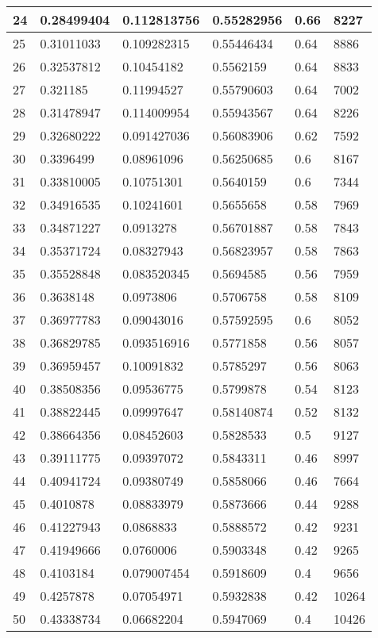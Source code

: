 \begin{longtable}{|l|l|l|l|l|l|}
24 & 0.28499404 & 0.112813756 & 0.55282956 & 0.66 & 8227 \\ \hline 
25 & 0.31011033 & 0.109282315 & 0.55446434 & 0.64 & 8886 \\ \hline 
26 & 0.32537812 & 0.10454182 & 0.5562159 & 0.64 & 8833 \\ \hline 
27 & 0.321185 & 0.11994527 & 0.55790603 & 0.64 & 7002 \\ \hline 
28 & 0.31478947 & 0.114009954 & 0.55943567 & 0.64 & 8226 \\ \hline 
29 & 0.32680222 & 0.091427036 & 0.56083906 & 0.62 & 7592 \\ \hline 
30 & 0.3396499 & 0.08961096 & 0.56250685 & 0.6 & 8167 \\ \hline 
31 & 0.33810005 & 0.10751301 & 0.5640159 & 0.6 & 7344 \\ \hline 
32 & 0.34916535 & 0.10241601 & 0.5655658 & 0.58 & 7969 \\ \hline 
33 & 0.34871227 & 0.0913278 & 0.56701887 & 0.58 & 7843 \\ \hline 
34 & 0.35371724 & 0.08327943 & 0.56823957 & 0.58 & 7863 \\ \hline 
35 & 0.35528848 & 0.083520345 & 0.5694585 & 0.56 & 7959 \\ \hline 
36 & 0.3638148 & 0.0973806 & 0.5706758 & 0.58 & 8109 \\ \hline 
37 & 0.36977783 & 0.09043016 & 0.57592595 & 0.6 & 8052 \\ \hline 
38 & 0.36829785 & 0.093516916 & 0.5771858 & 0.56 & 8057 \\ \hline 
39 & 0.36959457 & 0.10091832 & 0.5785297 & 0.56 & 8063 \\ \hline 
40 & 0.38508356 & 0.09536775 & 0.5799878 & 0.54 & 8123 \\ \hline 
41 & 0.38822445 & 0.09997647 & 0.58140874 & 0.52 & 8132 \\ \hline 
42 & 0.38664356 & 0.08452603 & 0.5828533 & 0.5 & 9127 \\ \hline 
43 & 0.39111775 & 0.09397072 & 0.5843311 & 0.46 & 8997 \\ \hline 
44 & 0.40941724 & 0.09380749 & 0.5858066 & 0.46 & 7664 \\ \hline 
45 & 0.4010878 & 0.08833979 & 0.5873666 & 0.44 & 9288 \\ \hline 
46 & 0.41227943 & 0.0868833 & 0.5888572 & 0.42 & 9231 \\ \hline 
47 & 0.41949666 & 0.0760006 & 0.5903348 & 0.42 & 9265 \\ \hline 
48 & 0.4103184 & 0.079007454 & 0.5918609 & 0.4 & 9656 \\ \hline 
49 & 0.4257878 & 0.07054971 & 0.5932838 & 0.42 & 10264 \\ \hline 
50 & 0.43338734 & 0.06682204 & 0.5947069 & 0.4 & 10426 \\ \hline 
\end{longtable}